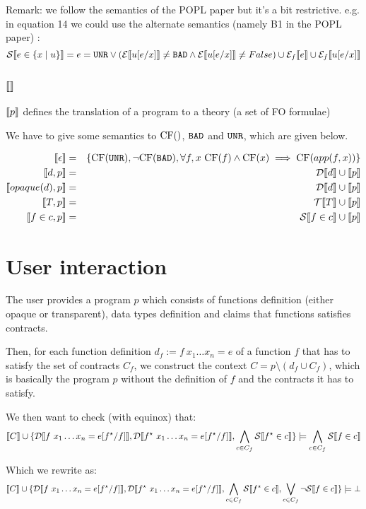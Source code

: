 \documentclass{article}
\begin{document}
Remark: we follow the semantics of the POPL paper but it's a bit restrictive.
e.g. in equation 14 we could use the alternate semantics (namely B1 in the POPL paper) : 
$$\mathcal{S} \llbracket e \in \{x \mid u \} \rrbracket = e = \texttt{UNR} \lor (\mathcal{E} \llbracket u[e/x] \rrbracket \neq \texttt{BAD} \land \mathcal{E} \llbracket u[e/x] \rrbracket \neq False) \cup \mathcal{E}_{f} \llbracket e \rrbracket \cup \mathcal{E}_{f} \llbracket u[e/x] \rrbracket$$

\subsection{$\llbracket  \rrbracket$}
$\llbracket p \rrbracket$ defines the translation of a program to a theory (a set of FO formulae)

We have to give some semantics to $\mbox{CF}()$, $\texttt{BAD}$ and $\texttt{UNR}$, which are given below.

\begin{eqnarray}
\llbracket \epsilon \rrbracket &=& \{ \mbox{CF}(\texttt{UNR}), \lnot \mbox{CF}(\texttt{BAD}), \forall f,x~\mbox{CF}(f) \land \mbox{CF}(x) \implies \mbox{CF}(app(f,x)) \}\\
\llbracket d,p \rrbracket &=& \mathcal{D} \llbracket d \rrbracket \cup \llbracket p \rrbracket\\
\llbracket opaque(d),p \rrbracket &=& \mathcal{D} \llbracket d \rrbracket \cup \llbracket p \rrbracket\\
\llbracket T,p \rrbracket &=& \mathcal{T} \llbracket T \rrbracket \cup \llbracket p \rrbracket\\
\llbracket f \in c,p \rrbracket &=& \mathcal{S} \llbracket f \in c \rrbracket \cup \llbracket p \rrbracket\\
\end{eqnarray}

\section{User interaction}

The user provides a program $p$ which consists of functions definition (either opaque or transparent), data types definition and claims that functions satisfies contracts.

Then, for each function definition $d_f := f~x_1 \dots x_n = e$ of a function $f$ that has to satisfy the set of contracts $C_f$, we construct the context $C = p \setminus ( d_f \cup C_f )$, which is basically the program $p$ without the definition of $f$ and the contracts it has to satisfy. 

We then want to check (with equinox) that:
 $$\llbracket C \rrbracket \cup \{ \mathcal{D} \llbracket f~x_1 \dots x_n = e[f^\star/f] \rrbracket, \mathcal{D} \llbracket f^\star~x_1 \dots x_n = e[f^\star/f] \rrbracket, \bigwedge_{c \in C_f} \mathcal{S} \llbracket f^\star \in c \rrbracket \} \models \bigwedge_{c \in C_f} \mathcal{S} \llbracket f \in c \rrbracket$$

Which we rewrite as:
 $$\llbracket C \rrbracket \cup \{ \mathcal{D} \llbracket f~x_1 \dots x_n = e[f^\star/f] \rrbracket, \mathcal{D} \llbracket f^\star~x_1 \dots x_n = e[f^\star/f] \rrbracket, \bigwedge_{c \in C_f} \mathcal{S} \llbracket f^\star \in c \rrbracket,  \bigvee_{c \in C_f} \lnot \mathcal{S} \llbracket f \in c \rrbracket \} \models \bot$$
\end{document}

